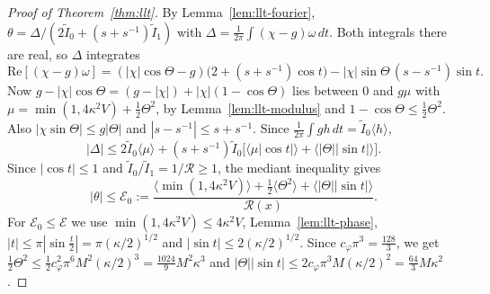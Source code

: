 \begin{proof}[Proof of Theorem~\ref{thm:llt}]
By Lemma~\ref{lem:llt-fourier}, $\theta=\Delta/(2\tilde I_0+(s+s^{-1})\tilde I_1)$ with
$\Delta=\frac1{2\pi}\int(\chi-g)\omega\,dt$. Both integrals there are real, so $\Delta$ integrates
\[
\mathrm{Re}[(\chi-g)\omega]=(|\chi|\cos\Theta-g)\bigl(2+(s+s^{-1})\cos t\bigr)
-|\chi|\sin\Theta\,(s-s^{-1})\sin t .
\]
Now $g-|\chi|\cos\Theta=(g-|\chi|)+|\chi|(1-\cos\Theta)$ lies between $0$ and $g\mu$ with
$\mu=\min(1,4\kappa^2V)+\frac12\Theta^2$, by Lemma~\ref{lem:llt-modulus} and
$1-\cos\Theta\le\frac12\Theta^2$. Also
$|\chi\sin\Theta|\le g|\Theta|$ and $|s-s^{-1}|\le s+s^{-1}$. Since
$\frac1{2\pi}\int gh\,dt=\tilde I_0\langle h\rangle$,
\[
|\Delta|\le2\tilde I_0\langle\mu\rangle+(s+s^{-1})\tilde I_0\bigl[\langle\mu|\cos t|\rangle
+\langle|\Theta||\sin t|\rangle\bigr].
\]
Since $|\cos t|\le1$ and $\tilde I_0/\tilde I_1=1/\mathcal R\ge1$, the mediant inequality gives
\[
|\theta|\le\mathcal E_0:=\frac{\langle\min(1,4\kappa^2V)\rangle+\frac12\langle\Theta^2\rangle
+\langle|\Theta||\sin t|\rangle}{\mathcal R(x)}.
\]
For $\mathcal E_0\le\mathcal E$ we use $\min(1,4\kappa^2V)\le4\kappa^2V$,
Lemma~\ref{lem:llt-phase}, $|t|\le\pi|\sin\frac t2|=\pi(\kappa/2)^{1/2}$ and
$|\sin t|\le2(\kappa/2)^{1/2}$. Since $c_\varphi\pi^3=\frac{128}3$, we get
$\frac12\Theta^2\le\frac12c_\varphi^2\pi^6M^2(\kappa/2)^3=\frac{1024}9M^2\kappa^3$ and
$|\Theta||\sin t|\le2c_\varphi\pi^3M(\kappa/2)^2=\frac{64}3M\kappa^2$.
\end{proof}

